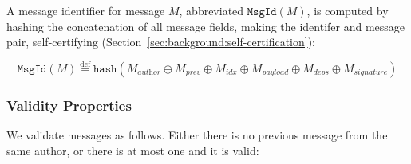 \documentclass[9pt, oneside]{article}   	%
\newcommand{\defeq}{\overset{\mathrm{def}}{=}}
\begin{document}
\begin{table}[t]
\caption{Message schema.}
\label{tb:message-schema}
\end{table}

A message identifier for message $M$, abbreviated $\texttt{MsgId}(M)$, is computed by hashing the concatenation of all message fields, making the identifer and message pair, self-certifying (Section~\ref{sec:background:self-certification}):

\begin{equation*}
\texttt{MsgId}(M) \defeq \texttt{hash}(M_{\textit{author}} \oplus M_{\textit{prev}} \oplus M_{\textit{idx}} \oplus M_{\textit{payload}} \oplus M_{\textit{deps}} \oplus M_{\textit{signature}})
\end{equation*}

\subsubsection{Validity Properties}
\label{sec:design:message:valid}

We validate messages as follows. Either there is no previous message from the same author, or there is at most one and it is valid: 
\end{document}
